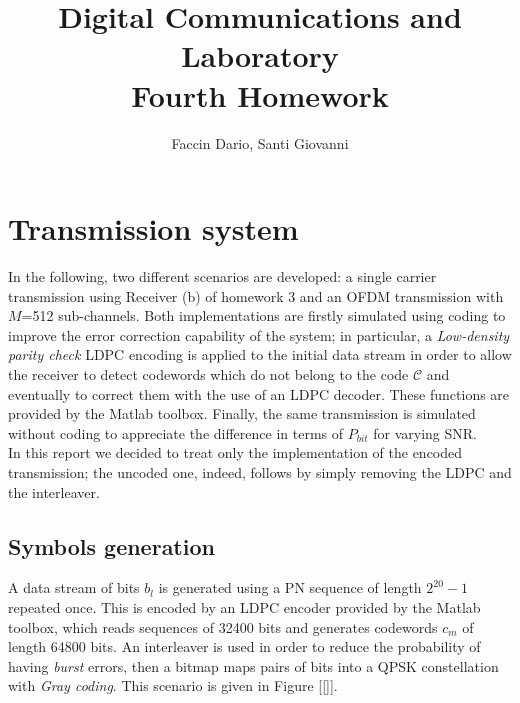 \documentclass[a4paper, 12pt]{report}
\begin{document}
	
\title{Digital Communications and Laboratory \\ Fourth Homework}
\author{Faccin Dario, Santi Giovanni}
\date{}
\maketitle

\section*{Transmission system}
In the following, two different scenarios are developed: a single carrier transmission using Receiver (b) of homework 3 and an OFDM transmission with $M$=512 sub-channels. Both implementations are firstly simulated using coding to improve the error correction capability of the system; in particular, a \textit{Low-density parity check} LDPC encoding is applied to the initial data stream in order to allow the receiver to detect codewords which do not belong to the code $\mathcal{C}$ and eventually to correct them with the use of an LDPC decoder. These functions are provided by the Matlab toolbox. Finally, the same transmission is simulated without coding to appreciate the difference in terms of $P_{bit}$ for varying SNR. \\
In this report we decided to treat only the implementation of the encoded transmission; the uncoded one, indeed, follows by simply removing the LDPC and the interleaver.

\subsection*{Symbols generation}
A data stream of bits $b_l$ is generated using a PN sequence of length $2^{20}-1$ repeated once. This is encoded by an LDPC encoder provided by the Matlab toolbox, which reads sequences of 32400 bits and generates codewords $c_m$ of length 64800 bits. An interleaver is used in order to reduce the probability of having \textit{burst} errors, then a bitmap maps pairs of bits into a QPSK constellation with \textit{Gray coding}. This scenario is given in Figure [\ref{}].
\end{document}

